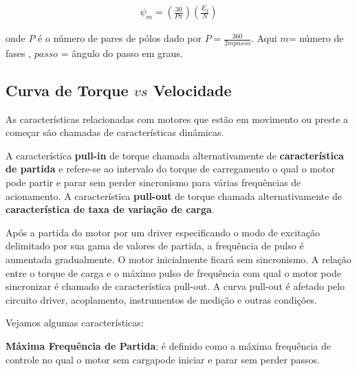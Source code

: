 \begin{eqnarray}
\label{eq:eq11a}
\psi_m = \left(\frac{30}{P \pi}\right) \left(\frac{E_f}{N}\right)
\end{eqnarray}

onde $P$ é o número de pares de pólos dado por $P = \frac{360}{2mpasso}$. Aqui $m$= número de fases , $passo$ = ângulo do passo em graus.


\subsection{Curva de Torque $vs$ Velocidade}
As características relacionadas com motores que estão em movimento ou preste a começar são chamadas de características dinâmicas.

A característica \textbf{pull-in} de torque chamada alternativamente de \textbf{característica de partida} e refere-se ao intervalo do torque de carregamento o qual o motor pode partir e parar sem perder sincronismo para várias frequências de acionamento.
A característica \textbf{pull-out} de torque chamada alternativamente de \textbf{característica de taxa de variação de carga}.

Após a partida do motor por um driver especificando o modo de excitação delimitado por sua gama de valores de partida, a frequência de pulso é aumentada gradualmente. O motor inicialmente ficará sem sincronismo. A relação entre o torque de carga e o máximo pulso de frequência com qual o motor pode sincronizar é chamado de característica pull-out. A curva pull-out é afetado pelo circuito driver, acoplamento, instrumentos de medição e outras condições.

Vejamos algumas características:

\textbf{Máxima Frequência de Partida}: é definido como a máxima frequência de controle no qual o motor sem cargapode iniciar e parar sem perder passos.